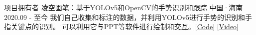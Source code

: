 \begin{cventries}


\cventry
{项目拥有者} %
{凌空画笔：基于YOLOv5和OpenCV的手势识别和跟踪} %
{中国·海南} %
{2020.09 - 至今} %
{
    我们自己收集和标注的数据，并利用YOLOv5进行手势的识别和手指关键点的识别。
    可以利用它与PPT等软件进行绘制和交互。\textcolor{awesome-red}{\href{https://github.com/beiyuouo/mid-air-draw}{[Code]}} \textcolor{awesome-red}{\href{https://www.bilibili.com/video/BV15V411a7WB/}{[Video]}}
}



\end{cventries}
